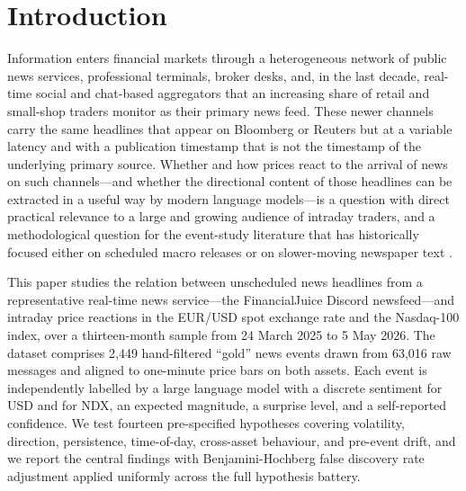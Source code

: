 \section{Introduction}
\label{sec:introduction}

Information enters financial markets through a heterogeneous network of
public news services, professional terminals, broker desks, and, in
the last decade, real-time social and chat-based aggregators that an
increasing share of retail and small-shop traders monitor as their
primary news feed. These newer channels carry the same headlines that
appear on Bloomberg or Reuters but at a variable latency and with a
publication timestamp that is not the timestamp of the underlying
primary source. Whether and how prices react to the arrival of news
on such channels---and whether the directional content of those
headlines can be extracted in a useful way by modern language
models---is a question with direct practical relevance to a large
and growing audience of intraday traders, and a methodological
question for the event-study literature that has historically focused
either on scheduled macro releases \citep{andersen2003micro} or on
slower-moving newspaper text
\citep{tetlock2007giving, loughran2011liability}.

This paper studies the relation between unscheduled news headlines
from a representative real-time news service---the FinancialJuice
Discord newsfeed---and intraday price reactions in the EUR/USD spot
exchange rate and the Nasdaq-100 index, over a thirteen-month sample
from 24 March 2025 to 5 May 2026. The dataset comprises 2{,}449
hand-filtered ``gold'' news events drawn from 63{,}016 raw messages
and aligned to one-minute price bars on both assets. Each event is
independently labelled by a large language model with a discrete
sentiment for USD and for NDX, an expected magnitude, a surprise
level, and a self-reported confidence. We test fourteen pre-specified
hypotheses covering volatility, direction, persistence, time-of-day,
cross-asset behaviour, and pre-event drift, and we report the central
findings with Benjamini-Hochberg false discovery rate adjustment
\citep{benjamini1995controlling} applied uniformly across the full
hypothesis battery.

